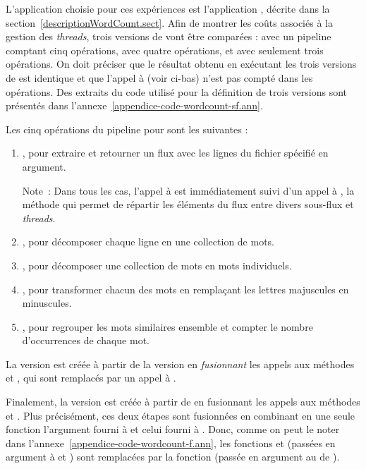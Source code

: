 L'application choisie pour ces exp\'eriences est l'application , d\'ecrite dans la section~\ref{descriptionWordCount.sect}. Afin de montrer les coûts associés à la gestion des \emph{threads}, trois versions de  vont être comparées :  avec un pipeline comptant cinq op\'erations,  avec quatre opérations, et  avec seulement trois op\'erations. On doit pr\'eciser que le r\'esultat obtenu en ex\'ecutant les trois versions de  est identique et que l'appel à  (voir ci-bas) n'est pas compté dans les opérations. Des extraits du code utilis\'e pour la définition de trois versions sont pr\'esent\'es dans l'annexe~\ref{appendice-code-wordcount-sf.ann}. 

\goodbreak
Les cinq op\'erations du pipeline pour  sont les suivantes :
\begin{enumerate}
\item {}, pour extraire et retourner un flux avec les lignes du fichier sp\'ecifi\'e en argument.

Note~: Dans tous les cas, l'appel à  est immédiatement suivi d'un appel à , la m\'ethode qui permet de r\'epartir les \'el\'ements du flux entre divers sous-flux et \emph{threads}.

\item {}, pour d\'ecomposer chaque ligne en une collection de mots.

\item {}, pour d\'ecomposer une collection de mots en mots individuels.

\item {}, pour transformer chacun des mots en rempla\c{c}ant les lettres majuscules en minuscules.

\item {}, pour regrouper les mots similaires ensemble et compter le nombre d'occurrences de chaque mot.
\end{enumerate}

La version  est cr\'e\'ee \`a partir de la version  en \emph{fusionnant} les appels aux m\'ethodes  et , qui sont remplac\'es par un appel à .

Finalement, 
la version  est cr\'e\'ee \`a partir de  en fusionnant les appels aux m\'ethodes  et . Plus précisément, ces deux étapes sont fusionn\'ees en combinant en une seule fonction l'argument fourni à  et celui fourni à . Donc, comme on peut le noter dans l'annexe~\ref{appendice-code-wordcount-f.ann}, les fonctions  et  (pass\'ees en argument à  et ) sont remplac\'ees par la fonction  (passée en argument au  de ).

